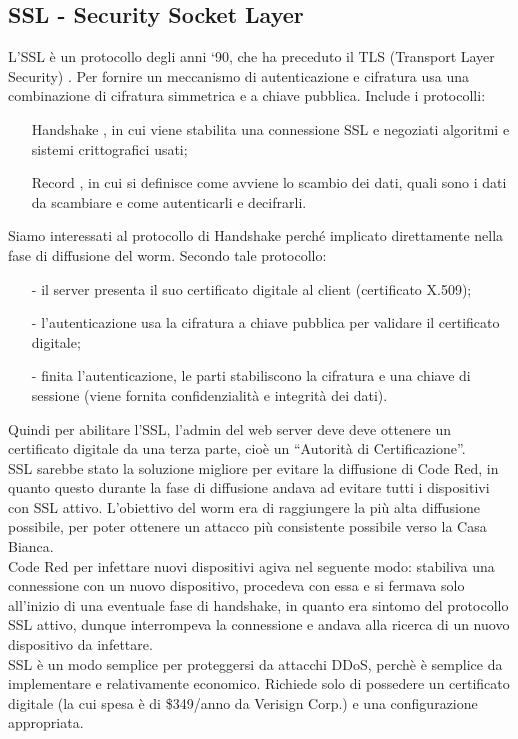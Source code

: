 \subsection{SSL - Security Socket Layer}
L’SSL è un protocollo degli anni ‘90, che ha preceduto il TLS (Transport Layer Security) . Per fornire un meccanismo di autenticazione e cifratura usa una combinazione di cifratura simmetrica e a chiave pubblica. Include i protocolli:
\begin{itemize}
\item[Handshake], in cui viene stabilita una connessione SSL e negoziati algoritmi e sistemi crittografici usati;
\item[Record], in cui si definisce come avviene lo scambio dei dati, quali sono i dati da scambiare e come autenticarli e decifrarli.
\end{itemize}
Siamo interessati al protocollo di Handshake perché implicato direttamente nella fase di diffusione del worm. Secondo tale protocollo:
\begin{itemize}
\item[-] il server presenta il suo certificato digitale al client (certificato X.509);
\item[-] l’autenticazione usa la cifratura a chiave pubblica per validare il certificato digitale;
\item[-] finita l’autenticazione, le parti stabiliscono la cifratura e una chiave di sessione (viene fornita confidenzialità e integrità dei dati).
\end{itemize}
Quindi per abilitare l’SSL, l’admin del web server deve deve ottenere un certificato digitale da una terza parte, cioè un “Autorità di Certificazione”.\\
SSL sarebbe stato la soluzione migliore per evitare la diffusione di Code Red, in quanto questo durante la fase di diffusione andava ad evitare tutti i dispositivi con SSL attivo. L’obiettivo del worm era di raggiungere la più alta diffusione possibile, per poter ottenere un attacco più consistente possibile verso la Casa Bianca.\\
Code Red per infettare nuovi dispositivi agiva nel seguente modo: stabiliva una connessione con un nuovo dispositivo, procedeva con essa e si fermava solo all’inizio di una eventuale fase di handshake, in quanto era sintomo del protocollo SSL attivo, dunque interrompeva la connessione e andava alla ricerca di un nuovo dispositivo da infettare.\\
SSL è un modo semplice per proteggersi da attacchi DDoS, perchè è semplice da implementare e relativamente economico. Richiede solo di possedere un certificato digitale (la cui spesa è di \$349/anno da Verisign Corp.) e una configurazione appropriata.\\
